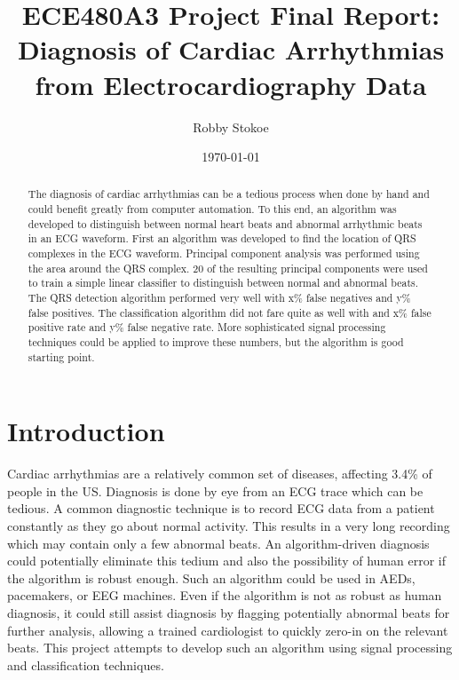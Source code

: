 \documentclass[12pt,letter]{article}
\title{ECE480A3 Project Final Report: \\ Diagnosis of Cardiac Arrhythmias from 
Electrocardiography Data}
\author{Robby Stokoe}
\date{\today}
\begin{document}
\maketitle

\begin{abstract}
    The diagnosis of cardiac arrhythmias can be a tedious process when done by
    hand and could benefit greatly from computer automation.  To this end, an 
    algorithm was developed to distinguish between normal heart beats and
    abnormal arrhythmic beats in an ECG waveform.  First an algorithm was
    developed to find the location of QRS complexes in the ECG waveform.
    Principal component analysis was performed using the area around the QRS 
    complex.  20 of the resulting principal components were used to train a
    simple linear classifier to distinguish between normal and abnormal beats.
    The QRS detection algorithm performed very well with x\% false negatives and
    y\% false positives.  The classification algorithm did not fare quite as 
    well with and x\% false positive rate and y\% false negative rate.  More
    sophisticated signal processing techniques could be applied to improve these
    numbers, but the algorithm is good starting point.  
\end{abstract}

\section{Introduction} 
Cardiac arrhythmias are a relatively common set of diseases, affecting 3.4\% of
people in the US.  Diagnosis is done by eye from an ECG trace which can be
tedious.  A common diagnostic technique is to record ECG data from a patient
constantly as they go about normal activity.  This results in a very long
recording which may contain only a few abnormal beats.  An algorithm-driven
diagnosis could potentially eliminate this tedium and also the possibility of
human error if the algorithm is robust enough.  Such an algorithm could be used
in AEDs, pacemakers, or EEG machines.  Even if the algorithm is not as robust
as human diagnosis, it could still assist diagnosis by flagging potentially
abnormal beats for further analysis, allowing a trained cardiologist to quickly
zero-in on the relevant beats.  This project attempts to develop such an
algorithm using signal processing and classification techniques.  
\end{document}
